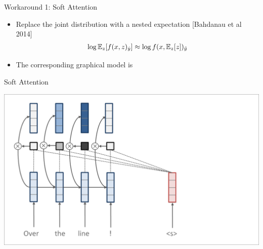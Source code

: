 \begin{frame}{Workaround 1: Soft Attention}
\begin{itemize}
\item Replace the joint distribution with a nested expectation
{\small[Bahdanau et al 2014]}
    \begin{eqnarray*}
        \log \mathbb{E}_z [f(x, z)_{\hat{y}}] \approx \log f(x,\mathbb{E}_z[z])_{\tilde{y}}
    \end{eqnarray*}
\item The corresponding graphical model is
\air
\begin{figure}
        \centering
    \end{figure}
\end{itemize}
\end{frame}

\begin{frame}{Soft Attention}

  \begin{center}
\includegraphics[scale=0.37]{nmt-attn4}
\end{center}
\end{frame}


